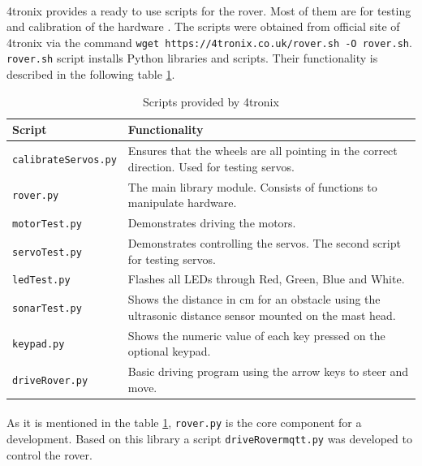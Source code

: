 \paragraph{}4tronix provides a ready to use scripts for the rover. Most of them are for testing and calibration of the hardware \cite{rover.prog:doc,}. The scripts were obtained from official site of 4tronix via the command \lstinline|wget https://4tronix.co.uk/rover.sh -O rover.sh|. \lstinline|rover.sh| script installs Python libraries and scripts. Their functionality is described in the following table \ref{tab:rv_scripts}.
\newpage
\begin{table}[h]
    \centering
    \begin{longtable}{|l|p{10cm}|}
        \hline
        \textbf{Script} & \textbf{Functionality}\\
        \hline
        \lstinline|calibrateServos.py| & Ensures that the wheels are all pointing in the correct direction. Used for testing servos. \\
        \hline
        \lstinline|rover.py| & The main library module. Consists of functions to manipulate hardware. \\
        \hline
        \lstinline|motorTest.py| & Demonstrates driving the motors. \\
        \hline
        \lstinline|servoTest.py| & Demonstrates controlling the servos. The second script for testing servos. \\
        \hline
        \lstinline|ledTest.py| & Flashes all LEDs through Red, Green, Blue and White. \\
        \hline
        \lstinline|sonarTest.py| & Shows the distance in cm for an obstacle using the ultrasonic distance sensor mounted on the mast head. \\
        \hline
        \lstinline|keypad.py| & Shows the numeric value of each key pressed on the optional keypad. \\
        \hline
        \lstinline|driveRover.py| & Basic driving program using the arrow keys to steer and move. \\
        \hline
    \end{longtable}
    \caption{Scripts provided by 4tronix}
    \label{tab:rv_scripts}
\end{table}
\vspace{-10mm}
\paragraph{}As it is mentioned in the table \ref{tab:rv_scripts},  \lstinline|rover.py| is the core component for a development. Based on this library a script \lstinline|driveRovermqtt.py| was developed to control the rover. 

